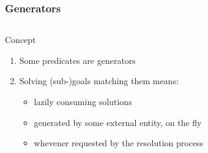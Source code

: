 \documentclass[presentation]{beamer}
\begin{document}
\begin{frame}[allowframebreaks]
    \frametitle{Generators}

    \begin{columns}
        \begin{column}{.6\linewidth}
            \begin{exampleblock}{Concept}
                \begin{enumerate}\small
                    \item Some predicates are \alert{generators}
                    \item Solving (sub-)goals matching them means:
                    \begin{itemize}\scriptsize
                        \item lazily consuming solutions 
                        \item generated by some external entity, on the fly
                        \item whevener requested by the resolution process
                    \end{itemize}
                \end{enumerate}
            \end{exampleblock}        
        \end{column}
        \hfill
        \begin{column}{.4\linewidth}

\end{column}
\end{columns}
\end{frame}
\end{document}
